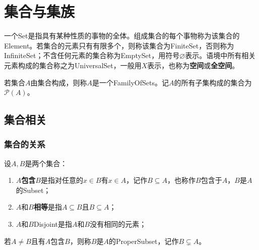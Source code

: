 \section{集合与集族}
\begin{definition}
	一个\gls{Set}是指具有某种性质的事物的全体。组成集合的每个事物称为该集合的\gls{Element}。若集合的元素只有有限多个，则称该集合为\gls{FiniteSet}，否则称为\gls{InfiniteSet}；不含任何元素的集合称为\gls{EmptySet}，用符号$\varnothing$表示。语境中所有相关元素构成的集合称之为\gls{UniversalSet}，一般用$X$表示，也称为\textbf{空间}或\textbf{全空间}。
\end{definition}
\begin{definition}
	若集合$A$由集合构成，则称$A$是一个\gls{FamilyOfSets}。记$A$的所有子集构成的集合为$\mathscr{P}(A)$。
\end{definition}

\subsection{集合相关}
\subsubsection{集合的关系}
\begin{definition}
	设$A,B$是两个集合：
	\begin{enumerate}
		\item $A$\textbf{包含}$B$是指对任意的$x\in B$有$x\in A$，记作$B\subseteq A$，也称作$B$包含于$A$，$B$是$A$的\gls{Subset}；
		\item $A$和$B$\textbf{相等}是指$A\subseteq B$且$B\subseteq A$；
		\item $A$和$B$\gls{Disjoint}是指$A$和$B$没有相同的元素；
	\end{enumerate}
	若$A\ne B$且有$A$包含$B$，则称$B$是$A$的\gls{ProperSubset}，记作$B\subsetneq A$。
\end{definition}
